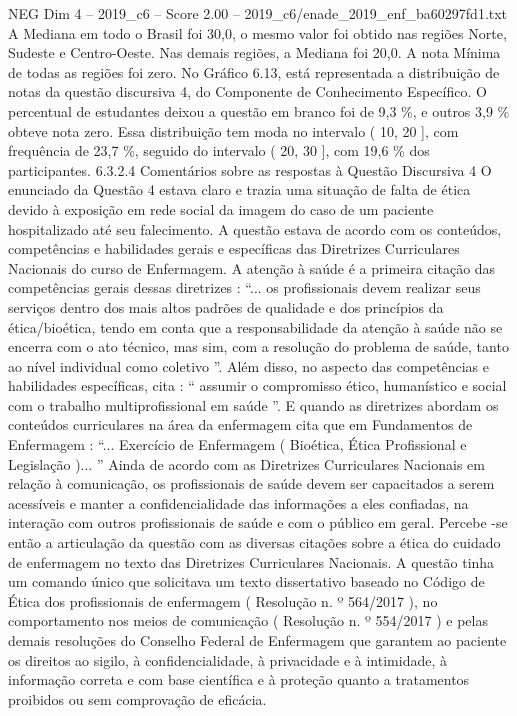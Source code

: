 \begin{textsample}{NEG Dim 4 – 2019\_c6 – Score 2.00 – 2019\_c6/enade\_2019\_enf\_ba60297fd1.txt}
A Mediana em todo o Brasil foi 30,0, o mesmo valor foi obtido nas regiões Norte, Sudeste e Centro-Oeste.
Nas demais regiões, a Mediana foi 20,0.
A nota Mínima de todas as regiões foi zero.
No Gráfico 6.13, está representada a distribuição de notas da questão discursiva 4, do Componente de Conhecimento Específico.
O percentual de estudantes deixou a questão em branco foi de 9,3 \%, e outros 3,9 \% obteve nota zero.
Essa distribuição tem moda no intervalo ( 10, 20 ], com frequência de 23,7 \%, seguido do intervalo ( 20, 30 ], com 19,6 \% dos participantes. 6.3.2.4 Comentários sobre as respostas à Questão Discursiva 4 O enunciado da Questão 4 estava claro e trazia uma situação de falta de ética devido à exposição em rede social da imagem do caso de um paciente hospitalizado até seu falecimento.
A questão estava de acordo com os conteúdos, competências e habilidades gerais e específicas das Diretrizes Curriculares Nacionais do curso de Enfermagem.
A atenção à saúde é a primeira citação das competências gerais dessas diretrizes : “... os profissionais devem realizar seus serviços dentro dos mais altos padrões de qualidade e dos princípios da ética/bioética, tendo em conta que a responsabilidade da atenção à saúde não se encerra com o ato técnico, mas sim, com a resolução do problema de saúde, tanto ao nível individual como coletivo ”.
Além disso, no aspecto das competências e habilidades específicas, cita : “ assumir o compromisso ético, humanístico e social com o trabalho multiprofissional em saúde ”.
E quando as diretrizes abordam os conteúdos curriculares na área da enfermagem cita que em Fundamentos de Enfermagem : “...
Exercício de Enfermagem ( Bioética, Ética Profissional e Legislação )... ” Ainda de acordo com as Diretrizes Curriculares Nacionais em relação à comunicação, os profissionais de saúde devem ser capacitados a serem acessíveis e manter a confidencialidade das informações a eles confiadas, na interação com outros profissionais de saúde e com o público em geral.
Percebe -se então a articulação da questão com as diversas citações sobre a ética do cuidado de enfermagem no texto das Diretrizes Curriculares Nacionais.
A questão tinha um comando único que solicitava um texto dissertativo baseado no Código de Ética dos profissionais de enfermagem ( Resolução n. º 564/2017 ), no comportamento nos meios de comunicação ( Resolução n. º 554/2017 ) e pelas demais resoluções do Conselho Federal de Enfermagem que garantem ao paciente os direitos ao sigilo, à confidencialidade, à privacidade e à intimidade, à informação correta e com base científica e à proteção quanto a tratamentos proibidos ou sem comprovação de eficácia.

\end{textsample}
